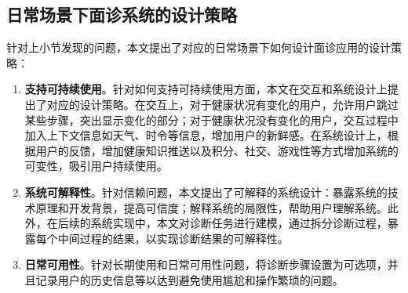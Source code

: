 \subsection{日常场景下面诊系统的设计策略}

针对上小节发现的问题，本文提出了对应的日常场景下如何设计面诊应用的设计策略：
\begin{enumerate}
    \item \textbf{支持可持续使用}。针对如何支持可持续使用方面，本文在交互和系统设计上提出了对应的设计策略。在交互上，对于健康状况有变化的用户，允许用户跳过某些步骤，突出显示变化的部分；对于健康状况没有变化的用户，交互过程中加入上下文信息如天气、时令等信息，增加用户的新鲜感。在系统设计上，根据用户的反馈，增加健康知识推送以及积分、社交、游戏性等方式增加系统的可变性，吸引用户持续使用。

    \item \textbf{系统可解释性}。针对信赖问题，本文提出了可解释的系统设计：暴露系统的技术原理和开发背景，提高可信度；解释系统的局限性，帮助用户理解系统。此外，在后续的系统实现中，本文对诊断任务进行建模，通过拆分诊断过程，暴露每个中间过程的结果，以实现诊断结果的可解释性。

    \item \textbf{日常可用性}。针对长期使用和日常可用性问题，将诊断步骤设置为可选项，并且记录用户的历史信息等以达到避免使用尴尬和操作繁琐的问题。
\end{enumerate}


